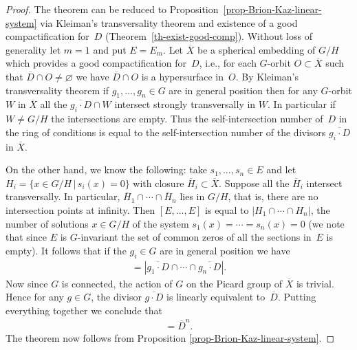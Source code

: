 \documentclass[10pt,a4paper]{amsart}
\numberwithin{equation}{section}
\theoremstyle{definition}
\begin{document}
\begin{proof}
The theorem can be reduced to Proposition~\ref{prop-Brion-Kaz-linear-system} via Kleiman's transversality theorem and existence of a good compactification for~$D$ (Theorem~\ref{th-exist-good-comp}). Without loss of generality let $m=1$ and put $E=E_m$. Let $\overline{X}$ be a spherical embedding of $G/H$ which provides a good compactification for~$D$, i.e., for each $G$-orbit $O\subset \overline{X}$ such that $\overline{D}\cap O\neq \varnothing$ we have $\overline{D}\cap O$ is a hypersurface in~$O$. By Kleiman's transversality theorem if $g_1, \ldots, g_n \in G$ are in general position then for any $G$-orbit $W$ in $\overline{X}$ all the $\overline{g_i \cdot D}\cap W$ intersect strongly transversally in $W$. In particular if $W\neq G/H$ the intersections are empty. Thus the self-intersection number of~$D$ in the ring of conditions is equal to the self-intersection number of the divisors $\overline{g_i \cdot D}$ in $\overline{X}$.

On the other hand, we know the following: take $s_1, \ldots, s_n \in E$ and let $H_i = \{x \in G/H \,|\, s_i(x) \allowbreak = 0 \}$ with closure $\overline{H}_i \subset \overline{X}$. Suppose all the $\overline{H}_i$ intersect transversally. In particular, $\overline{H}_1 \cap \cdots \cap \overline{H}_n$ lies in $G/H$, that is, there are no intersection points at infinity. Then $[E, \ldots, E]$ is equal to $|H_1 \cap \cdots \cap H_n|$, the number of solutions $x \in G/H$ of the system $s_1(x) = \cdots = s_n(x) = 0$ (we note that since $E$ is $G$-invariant the set of common zeros of all the sections in~$E$ is empty).
It follows that if the $g_i \in G$ are in general position we have
\begin{gather*} [E, \ldots, E] = |\overline{g_1 \cdot D} \cap \cdots \cap \overline{g_n \cdot D}|.
\end{gather*}
Now since $G$ is connected, the action of $G$ on the Picard group of $\overline{X}$ is trivial. Hence for any $g \in G$, the divisor $\overline{g \cdot D}$ is linearly equivalent to~$\overline{D}$. Putting everything together we conclude that
\begin{gather*} [E, \ldots, E] = \overline{D}^n.\end{gather*}
 The theorem now follows from Proposition \ref{prop-Brion-Kaz-linear-system}.
\end{proof}
\end{document}

